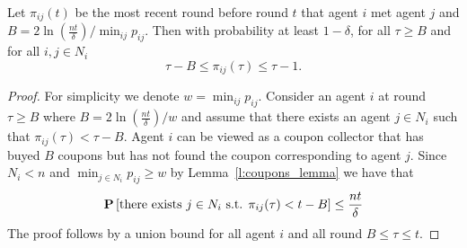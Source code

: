 \begin{lemma}\label{l:coupons}
Let $\pi_{ij}(t)$ be the most recent round before round $t$ that agent $i$ met agent $j$ 
and $B=2\ln(\frac{nt}{\delta})/\min_{ij}p_{ij}$.
Then with probability at least $1-\delta$, for all $\tau \geq B$ and for all
$i, j \in N_i$\[\tau-B\leq \pi_{ij}(\tau)\leq \tau-1.\]
\end{lemma}
\begin{proof}
For simplicity we denote $w=\min_{ij}p_{ij}$. 
Consider an agent $i$ at round $\tau \geq B$ where $B=2\ln(\frac{nt}{\delta})/w$
and assume that there exists an agent $j\in N_i$ such that $\pi_{ij}(\tau)< {\tau-B}$.
Agent $i$ can be viewed as a coupon collector that has buyed $B$ coupons
but has not found the coupon corresponding to agent $j$. Since $N_i<n$ and
$\min_{j \in N_i}p_{ij}\geq w$ by Lemma~\ref{l:coupons_lemma} we have that 
\[\bm{\mathrm{P}}\left[\text{there exists }j\in N_i \text{ s.t. }\pi_{ij}(\tau)< {t-B}\right]\leq \frac{nt}{\delta}\]
The proof follows by a union bound for all agent $i$ and all round $B\leq \tau \leq t$. 


\end{proof}
%
